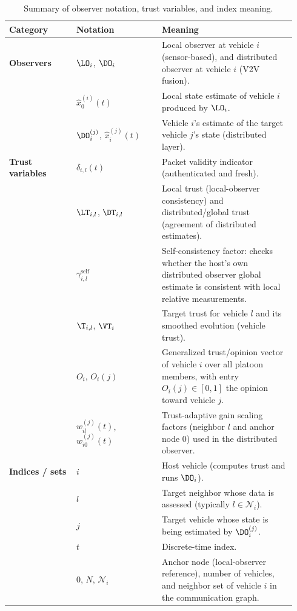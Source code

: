     \begin{table}[!t]
    \centering
    \caption{Summary of observer notation, trust variables, and index meaning.}
    \label{tab:notation_summary}
    \begin{tabular}{@{}p{0.22\linewidth}p{0.28\linewidth}p{0.44\linewidth}@{}}
    	\toprule
    Category & Notation & Meaning \\
    \midrule
    	\textbf{Observers}
    & $\LO_i$, $\DO_i$ & Local observer at vehicle $i$ (sensor-based), and distributed observer at vehicle $i$ (V2V fusion). \\
    & $\hat{x}_{0}^{(i)}(t)$ & Local state estimate of vehicle $i$ produced by $\LO_i$. \\
    & $\DO_i^{(j)}$, $\hat{x}_{i}^{(j)}(t)$ & Vehicle $i$'s estimate of the target vehicle $j$'s state (distributed layer). \\
    \addlinespace
    	\textbf{Trust variables}
    & $\delta_{i,l}(t)$ & Packet validity indicator (authenticated and fresh). \\
    & $\LT_{i,l}$, $\DT_{i,l}$ & Local trust (local-observer consistency) and distributed/global trust (agreement of distributed estimates). \\
    & $\gamma_{i,l}^{\text{self}}$ & Self-consistency factor: checks whether the host's own distributed observer global estimate is consistent with local relative measurements. \\
    & $\T_{i,l}$, $\VT_i$ & Target trust for vehicle $l$ and its smoothed evolution (vehicle trust). \\
    & $O_i$, $O_i(j)$ & Generalized trust/opinion vector of vehicle $i$ over all platoon members, with entry $O_i(j)\in[0,1]$ the opinion toward vehicle $j$. \\
    & $w_{il}^{(j)}(t)$, $w_{i0}^{(j)}(t)$ & Trust-adaptive gain scaling factors (neighbor $l$ and anchor node $0$) used in the distributed observer. \\
    \addlinespace
    	\textbf{Indices / sets}
    & $i$ & Host vehicle (computes trust and runs $\DO_i$). \\
    & $l$ & Target neighbor whose data is assessed (typically $l\in\mathcal{N}_i$). \\
    & $j$ & Target vehicle whose state is being estimated by $\DO_i^{(j)}$. \\
    & $t$ & Discrete-time index. \\
    & $0$, $N$, $\mathcal{N}_i$ & Anchor node (local-observer reference), number of vehicles, and neighbor set of vehicle $i$ in the communication graph. \\
    \bottomrule
    \end{tabular}
    \end{table}

